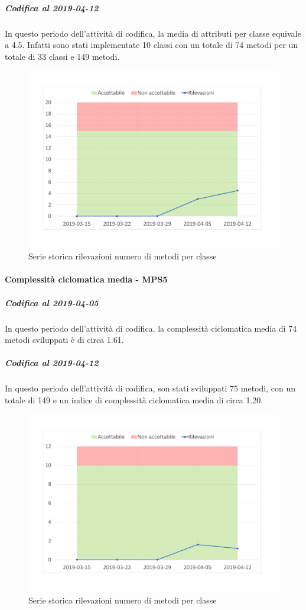 \subparagraph{Codifica al 2019-04-12}
In questo periodo dell'attività di codifica, la media di attributi per classe equivale a 4.5. Infatti sono stati implementate 10 classi con un totale di 74 metodi per un totale di 33 classi e 149 metodi.
\begin{figure}[H]
	\centering
	\includegraphics[scale=0.6]{images/resoconto/MPS4Chart.pdf}
	\caption{Serie storica rilevazioni numero di metodi per classe}	
\end{figure}

\paragraph{Complessità ciclomatica media - MPS5}
\subparagraph{Codifica al 2019-04-05}
In questo periodo dell'attività di codifica, la complessità ciclomatica media di 74 metodi sviluppati è di circa 1.61. 

\subparagraph{Codifica al 2019-04-12}
In questo periodo dell'attività di codifica, son stati sviluppati 75 metodi, con un totale di 149 e un indice di complessità ciclomatica media di circa 1.20.
\begin{figure}[H]
	\centering
	\includegraphics[scale=0.6]{images/resoconto/MPS5Chart.pdf}
	\caption{Serie storica rilevazioni numero di metodi per classe}	
\end{figure}


